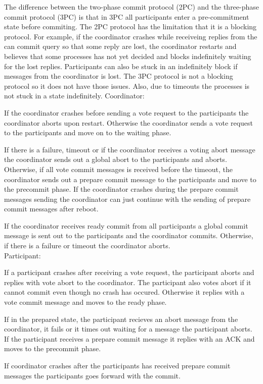 \documentclass[a4paper]{article}
\newcommand{\solution}[2][]{
  \ifthenelse{\equal{#1}{} \or \equal{#1}{a}}{\\[3pt]\textit{Solution: }\\[0.1cm]}{}
  \parbox[t]{\textwidth}{
    \ifthenelse{\equal{#1}{}}{}{#1)}
    \parbox[t]{0.95\textwidth}{#2}}\\
}
\begin{document}
%
\solution{
  The difference between the two-phase commit protocol (2PC)
  and the three-phase commit protocol (3PC) is that in 3PC all
  participants enter a pre-commitment state before commiting.
  The 2PC protocol has the limitation that it is a blocking
  protocol. For example, if the coordinator crashes while
  receiveing replies from the can commit query so that some reply
  are lost, the coordinator restarts and believes that some processes
  has not yet decided and blocks indefinitely waiting for the lost
  replies. Participants can also be stuck in an indefinitely block
  if messages from the coordinator is lost.
  The 3PC protocol is not a blocking protocol so it does not have
  those issues. Also, due to timeouts the processes is not stuck in
  a state indefinitely.
  \usebox{\userinput}
  Coordinator:

  If the coordinator crashes before sending a vote request to the
  participants the coordinator aborts upon restart. Otherwise the
  coordinator sends a vote request to the participants and move
  on to the waiting phase.

  If there is a failure, timeout or if the coordinator receives a
  voting abort message the coordinator sends out a global abort to
  the participants and aborts. Otherwise, if all vote commit messages
  is received before the timeout, the coordinator sends out a prepare
  commit message to the participants and move to the precommit phase.
  If the coordinator crashes during the prepare commit messages sending
  the coordinator can just continue with the sending of prepare commit
  messages after reboot.

  If the coordinator receives ready commit from all participants a global
  commit message is sent out to the participants and the coordinator
  commits. Otherwise, if there is a failure or timeout the coordinator
  aborts. \\

  Participant:

  If a participant crashes after receiving a vote request, the
  participant aborts and replies with vote abort to the coordinator.
  The participant also votes abort if it cannot commit even though
  no crash has occured. Otherwise it replies with a vote commit message
  and moves to the ready phase.

  If in the prepared state, the participant recieves an abort message
  from the coordinator, it fails or it times out waiting for a message
  the participant aborts. If the participant receives a prepare commit
  message it replies with an ACK and moves to the precommit phase.

  If coordinator crashes after the participants has received prepare
  commit messages the participants goes forward with the commit.
}
\end{document}
